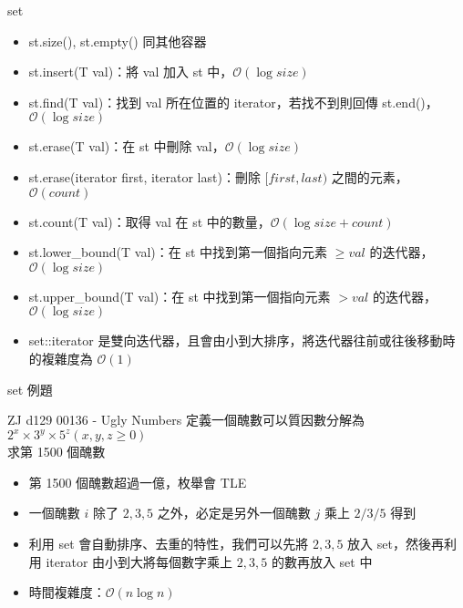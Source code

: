 \documentclass[aspectratio=169]{beamer}
\begin{document}
    \begin{frame}{set}
        \begin{itemize}
            \item<1-> st.size(), st.empty() 同其他容器
            \item<2-> st.insert(T val)：將 val 加入 st 中，$\mathcal{O}(\log size)$
            \item<3-> st.find(T val)：找到 val 所在位置的 iterator，若找不到則回傳 st.end()，$\mathcal{O}(\log size)$
            \item<3-> st.erase(T val)：在 st 中刪除 val，$\mathcal{O}(\log size)$
            \item<4-> st.erase(iterator first, iterator last)：刪除 $[first, last)$ 之間的元素，$\mathcal{O}(count)$
            \item<5-> st.count(T val)：取得 val 在 st 中的數量，$\mathcal{O}(\log size + count)$
            \item<6-> st.lower\_bound(T val)：在 st 中找到第一個指向元素 $\ge val$ 的迭代器，$\mathcal{O}(\log size)$
            \item<6-> st.upper\_bound(T val)：在 st 中找到第一個指向元素 $> val$ 的迭代器，$\mathcal{O}(\log size)$
            \item<7-> set::iterator 是雙向迭代器，且會由小到大排序，將迭代器往前或往後移動時的複雜度為 $\mathcal{O}(1)$
        \end{itemize}
    \end{frame}

    \begin{frame}{set 例題}
        \begin{block}{ZJ d129 00136 - Ugly Numbers}
            定義一個醜數可以質因數分解為 $2^x \times 3^y \times 5^z (x, y, z \ge 0)$\\
            求第 1500 個醜數
        \end{block}

        \begin{itemize}
            \item<2-> 第 1500 個醜數超過一億，枚舉會 TLE
            \item<3-> 一個醜數 $i$ 除了 $2, 3, 5$ 之外，必定是另外一個醜數 $j$ 乘上 $2/3/5$ 得到
            \item<4-> 利用 set 會自動排序、去重的特性，我們可以先將 $2, 3, 5$ 放入 set，然後再利用 iterator 由小到大將每個數字乘上 $2, 3, 5$ 的數再放入 set 中
            \item<5-> 時間複雜度：$\mathcal{O}(n\log n)$
        \end{itemize}
    \end{frame}
\end{document}
